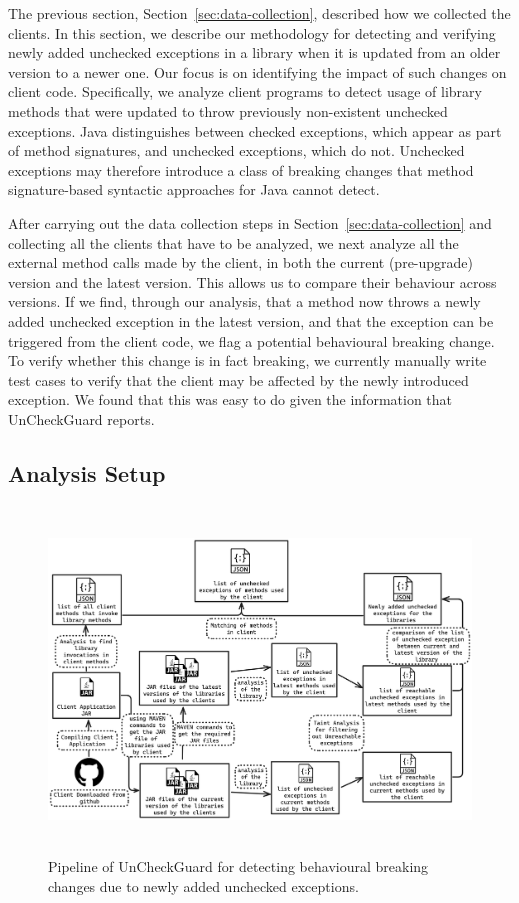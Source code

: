 The previous section, Section~\ref{sec:data-collection}, described how we collected the clients.
In this section, we describe our methodology for detecting and verifying newly added unchecked exceptions in a library when it is updated from an older version to a newer one. Our focus is on identifying the impact of such changes on client code. Specifically, we analyze client programs to detect usage of library methods that were updated to throw previously non-existent unchecked exceptions. Java distinguishes between checked exceptions, which appear as part of method signatures, and unchecked exceptions, which do not. Unchecked exceptions may therefore introduce a class of breaking changes that method signature-based syntactic approaches for Java cannot detect.

After carrying out the data collection steps in Section~\ref{sec:data-collection} and collecting all the clients that have to be analyzed, we next analyze all the external method calls made by the client, in both the current (pre-upgrade) version and the latest version. This allows us to compare their behaviour across versions. If we find, through our analysis, that a method now throws a newly added unchecked exception in the latest version, and that the exception can be triggered from the client code, we flag a potential behavioural breaking change. To verify whether this change is in fact breaking, we currently manually write test cases to verify that the client may be affected by the newly introduced exception. We found that this was easy to do given the information that UnCheckGuard reports.

\subsection{Analysis Setup}

\begin{figure}[hbt!]
    \centering
    \includegraphics[height=260pt]{diagram/finalfpioeline.png}
    \caption{Pipeline of UnCheckGuard for detecting behavioural breaking changes due to newly added unchecked exceptions.}
    \label{fig:jsonjava}
\end{figure}

